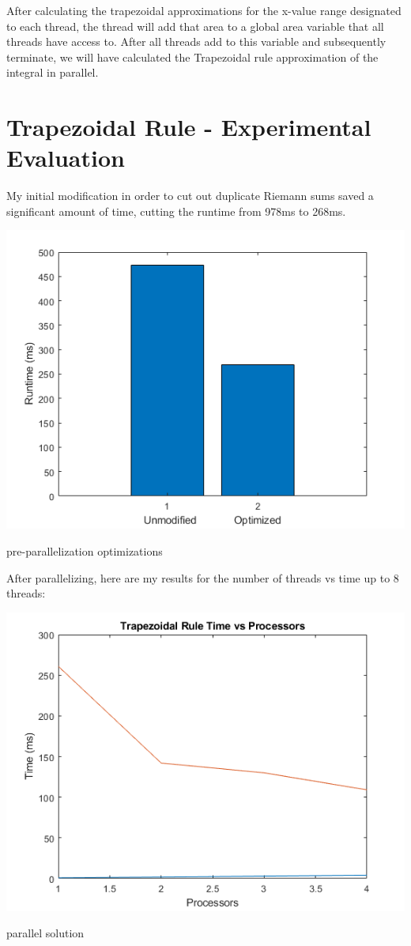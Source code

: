 \documentclass[a4paper]{article}
\begin{document}
After calculating the trapezoidal approximations for the x-value range designated to each thread, the thread will add that area to a global area variable that all threads have access to. After all threads add to this variable and subsequently terminate, we will have calculated the Trapezoidal rule approximation of the integral in parallel.

\section{Trapezoidal Rule - Experimental Evaluation}
My initial modification in order to cut out duplicate Riemann sums saved a significant amount of time, cutting the runtime from 978ms to 268ms.

\begin{center}
    \includegraphics[scale=1]{11a.png}
    \caption{pre-parallelization optimizations}
\end{center}

\noindent
After parallelizing, here are my results for the number of threads vs time up to 8 threads:

\begin{center}
    \includegraphics[scale=1]{11b.png}
    \caption{parallel solution}
\end{center}
\end{document}
